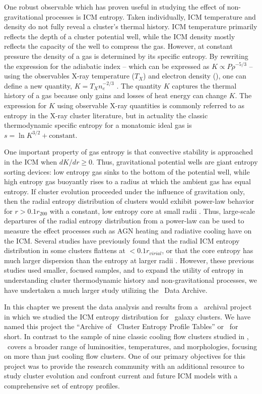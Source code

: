 One robust observable which has proven useful in studying the effect
of non-gravitational processes is ICM entropy. Taken individually, ICM
temperature and density do not fully reveal a cluster's thermal
history. ICM temperature primarily reflects the depth of a cluster
potential well, while the ICM density mostly reflects the capacity of
the well to compress the gas. However, at constant pressure the
density of a gas is determined by its specific entropy. By rewriting
the expression for the adiabatic index -- which can be expressed as $K
\propto P\rho^{-5/3}$ -- using the observables X-ray temperature
($T_X$) and electron density (\nelec), one can define a new quantity,
$K = T_X n_e^{-2/3}$ \citep{1999Natur.397..135P, davies00}. The
quantity $K$ captures the thermal history of a gas because only gains
and losses of heat energy can change $K$. The expression for $K$ using
observable X-ray quantities is commonly referred to as entropy in the
X-ray cluster literature, but in actuality the classic thermodynamic
specific entropy for a monatomic ideal gas is $s = \ln K^{3/2} +
\mathrm{constant}$.

One important property of gas entropy is that convective stability is
approached in the ICM when $dK/dr \geq 0$. Thus, gravitational
potential wells are giant entropy sorting devices: low entropy gas
sinks to the bottom of the potential well, while high entropy gas
buoyantly rises to a radius at which the ambient gas has equal
entropy. If cluster evolution proceeded under the influence of
gravitation only, then the radial entropy distribution of clusters
would exhibit power-law behavior for $r > 0.1 r_{200}$ with a
constant, low entropy core at small radii \citep{vkb05}. Thus,
large-scale departures of the radial entropy distribution from a
power-law can be used to measure the effect processes such as AGN
heating and radiative cooling have on the ICM. Several studies have
previously found that the radial ICM entropy distribution in some
clusters flattens at $< 0.1 r_{virial}$, or that the core entropy has
much larger dispersion than the entropy at larger radii
\citep{1996ApJ...473..692D, 1999Natur.397..135P, davies00, ponman03,
piffaretti05, radioquiet, pratt06, d06, morandi07}. However, these previous
studies used smaller, focused samples, and to expand the utility of
entropy in understanding cluster thermodynamic history and
non-gravitational processes, we have undertaken a much larger study
utilizing the \chandra\ Data Archive.

In this chapter we present the data analysis and results from a
\chandra\ archival project in which we studied the ICM entropy
distribution for \entsuppnum\ galaxy clusters. We have named this
project the ``Archive of \chandra\ Cluster Entropy Profile Tables'' or
\accept\ for short. In contrast to the sample of nine classic cooling
flow clusters studied in \citet[][hereafter D06]{d06}, \accept\ covers
a broader range of luminosities, temperatures, and morphologies,
focusing on more than just cooling flow clusters. One of our primary
objectives for this project was to provide the research community with
an additional resource to study cluster evolution and confront current
and future ICM models with a comprehensive set of entropy profiles.

